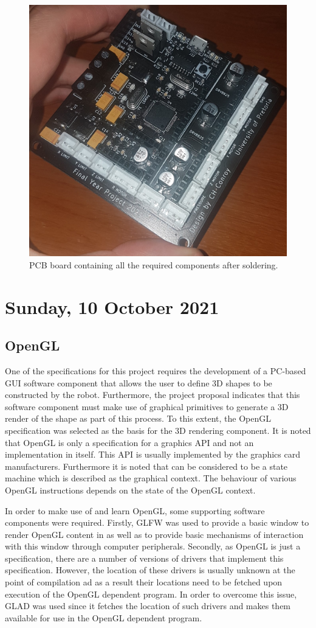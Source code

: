 \begin{figure}[H]
	\centering
	\includegraphics[width=0.6\linewidth]{figures/202110/final-pcb.jpg}
	\caption{PCB board containing all the required components after soldering.}
	\label{fig:assembled-pcb}
\end{figure}

\pendsign

\section[2021/10/10]{Sunday, 10 October 2021}

\subsection{OpenGL}

One of the specifications for this project requires the development of a PC-based \ac{GUI} software component that allows the user to define 3D shapes to be constructed by the robot. Furthermore, the project proposal indicates that this software component must make use of graphical primitives to generate a 3D render of the shape as part of this process. To this extent, the OpenGL specification was selected as the basis for the 3D rendering component. It is noted that OpenGL is only a specification for a graphics \ac{API} and not an implementation in itself. This \ac{API} is usually implemented by the graphics card manufacturers. Furthermore it is noted that can be considered to be a state machine which is described as the graphical context. The behaviour of various OpenGL instructions depends on the state of the OpenGL context.

In order to make use of and learn OpenGL, some supporting software components were required. Firstly, \ac{GLFW} was used to provide a basic window to render OpenGL content in as well as to provide basic mechanisms of interaction with this window through computer peripherals. Secondly, as OpenGL is just a specification, there are a number of versions of drivers that implement this specification. However, the location of these drivers is usually unknown at the point of compilation ad as a result their locations need to be fetched upon execution of the OpenGL dependent program. In order to overcome this issue, \ac{GLAD} was used since it fetches the location of such drivers and makes them available for use in the OpenGL dependent program.

